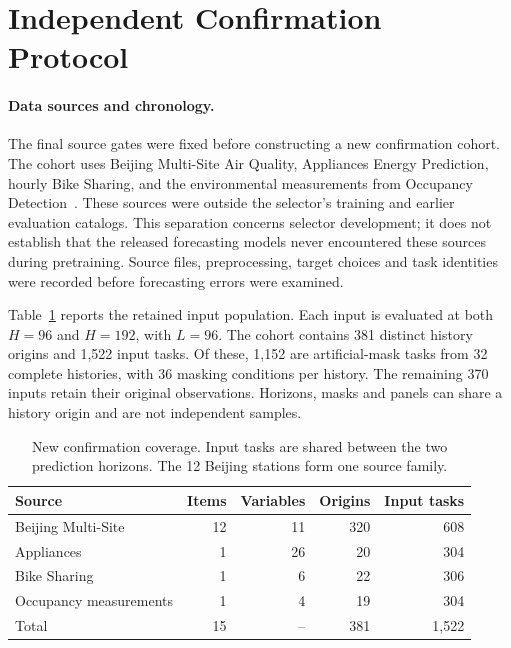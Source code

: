 \section{Independent Confirmation Protocol}
\label{sec:r6_protocol}

\paragraph{Data sources and chronology.}
The final source gates were fixed before constructing a new confirmation cohort. The cohort uses Beijing Multi-Site Air Quality, Appliances Energy Prediction, hourly Bike Sharing, and the environmental measurements from Occupancy Detection~\citep{uci2017beijing,uci2017appliances,uci2013bike,uci2016occupancy}. These sources were outside the selector's training and earlier evaluation catalogs. This separation concerns selector development; it does not establish that the released forecasting models never encountered these sources during pretraining. Source files, preprocessing, target choices and task identities were recorded before forecasting errors were examined.

Table~\ref{tab:r6_coverage} reports the retained input population. Each input is evaluated at both $H=96$ and $H=192$, with $L=96$. The cohort contains 381 distinct history origins and 1,522 input tasks. Of these, 1,152 are artificial-mask tasks from 32 complete histories, with 36 masking conditions per history. The remaining 370 inputs retain their original observations. Horizons, masks and panels can share a history origin and are not independent samples.

\begin{table}[t]
\caption{New confirmation coverage. Input tasks are shared between the two prediction horizons. The 12 Beijing stations form one source family.}
\label{tab:r6_coverage}
\centering\small
\begin{tabular}{lrrrr}
\toprule
Source & Items & Variables & Origins & Input tasks \\
\midrule
Beijing Multi-Site & 12 & 11 & 320 & 608 \\
Appliances & 1 & 26 & 20 & 304 \\
Bike Sharing & 1 & 6 & 22 & 306 \\
Occupancy measurements & 1 & 4 & 19 & 304 \\
\midrule
Total & 15 & -- & 381 & 1,522 \\
\bottomrule
\end{tabular}
\end{table}

